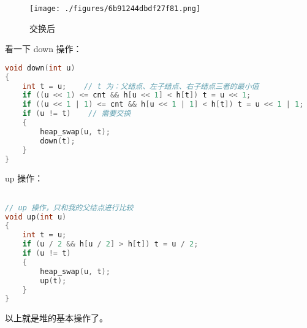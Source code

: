 \begin{figure}[ht]
\centering
\texttt{[image: ./figures/6b91244dbdf27f81.png]}
\caption{交换后} \label{fig_heap_2}
\end{figure}


看一下 down 操作：

\begin{lstlisting}[language=cpp]
void down(int u)
{
    int t = u;    // t 为：父结点、左子结点、右子结点三者的最小值
    if ((u << 1) <= cnt && h[u << 1] < h[t]) t = u << 1;
    if ((u << 1 | 1) <= cnt && h[u << 1 | 1] < h[t]) t = u << 1 | 1;
    if (u != t)    // 需要交换
    {
        heap_swap(u, t);
        down(t);
    }
}
\end{lstlisting}

up 操作：

\begin{lstlisting}[language=cpp]

// up 操作，只和我的父结点进行比较
void up(int u)
{
    int t = u;
    if (u / 2 && h[u / 2] > h[t]) t = u / 2;
    if (u != t)
    {
        heap_swap(u, t);
        up(t);
    }
}
\end{lstlisting}

以上就是堆的基本操作了。